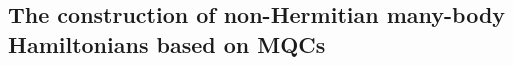 \documentclass[longbibliography, aps, prx, amsmath, amssymb, amsfonts, twocolumn,superscriptaddress, footinbib]{revtex4-1}
\begin{document}




	\subsection{The construction of non-Hermitian many-body Hamiltonians based on MQCs~\label{sec:scheme_method}}
\end{document}
